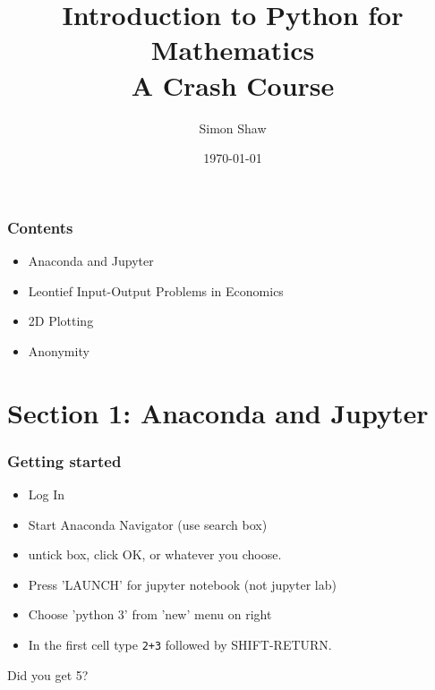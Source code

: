 \documentclass[dvips, %
               xcolor=pst,
               hyperref={colorlinks=false,
               dvips,
               citecolor=magenta,menucolor=cyan,
               bookmarks,bookmarksopen,pdfpagemode=UseThumbs}
              ]{beamer}
\title[Python for Mathematics]
      {Introduction to Python for Mathematics\\ A Crash Course}
\subtitle[beamer]{}
\institute[Maths]
          {Mathematics}
\author[Shaw]{Simon Shaw
}
\date{\today}
\makeatletter
\newcommand\changemode[1]{%
  \gdef\beamer@currentmode{#1}}
\makeatother
\begin{document}
\begin{frame}
\titlepage
\end{frame}

\newcommand{\BoardworkColour}{\relax}


\begin{frame}[fragile]\frametitle{Contents}

\begin{itemize}

\item Anaconda and Jupyter

\item Leontief Input-Output Problems in Economics

\item 2D Plotting

\item Anonymity

\end{itemize}

\end{frame}



\section{Section 1: Anaconda and Jupyter}

\begin{frame}[fragile]\frametitle{Getting started}

\begin{itemize}

\item Log In

\item Start Anaconda Navigator (use search box)

\item untick box, click OK, or whatever you choose.

\item Press 'LAUNCH' for jupyter notebook (not jupyter lab)

\item Choose 'python 3' from 'new' menu on right

\item In  the first cell type \verb|2+3| followed by 
SHIFT-RETURN.
\end{itemize}

Did you get 5?

\end{frame}
\end{document}
